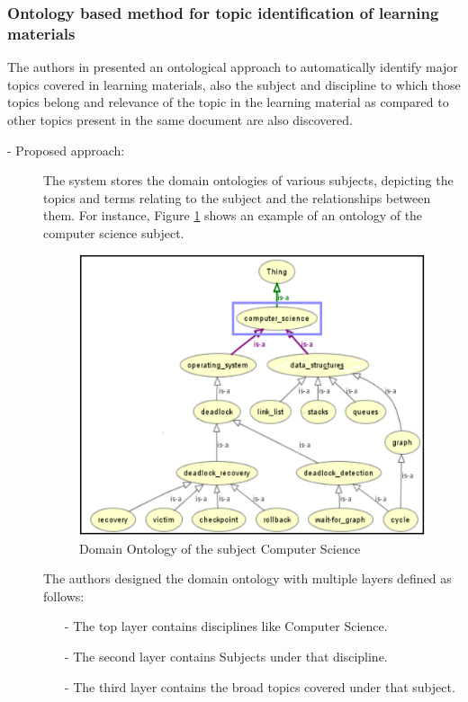 \subsubsection{Ontology based method for topic identification of learning materials}
The authors in \cite{a:ont} presented an ontological approach to automatically identify major topics covered in learning materials, also the subject and discipline to which those topics belong and relevance of the topic in the learning material as compared to other topics present in the same document are also discovered.
\begin{description}
\item[- Proposed approach:]
	
		The system stores the domain ontologies of various subjects, depicting the topics and terms relating to the subject and the relationships between them. For instance, Figure \ref{ont} shows an example of an ontology of the computer science subject.
				\begin{figure}[h!]
					\centering
					\includegraphics[scale=0.7]{graphics/ontology.PNG} 
					\caption{Domain Ontology of the subject Computer Science \cite{a:ont}} \label{ont} 
				\end{figure}
The authors designed the domain ontology with multiple layers defined as follows:
				\begin{itemize}
					\item[-] The top layer contains disciplines like Computer Science.  
					\item[-] The second layer contains Subjects under that discipline. 
					\item[-] The third layer contains the broad topics covered under that subject. \\

\end{itemize}
\end{description}
